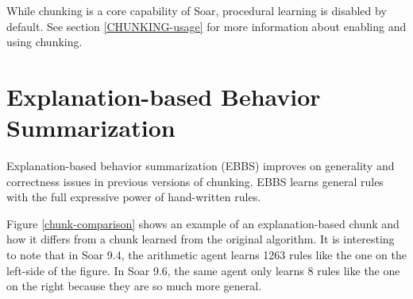 While chunking is a core capability of Soar, procedural learning is disabled by default.  See section \ref{CHUNKING-usage} for more information about enabling and using chunking.

\section{Explanation-based Behavior Summarization}

Explanation-based behavior summarization (EBBS) improves on generality and correctness issues in previous versions of chunking. EBBS learns general rules with the full expressive power of hand-written rules.

Figure \ref{chunk-comparison} shows an example of an explanation-based chunk and how it differs from a chunk learned from the original algorithm.  It is interesting to note that in Soar 9.4, the arithmetic agent learns 1263 rules like the one on the left-side of the figure.  In Soar 9.6, the same agent only learns 8 rules like the one on the right because they are so much more general. 

